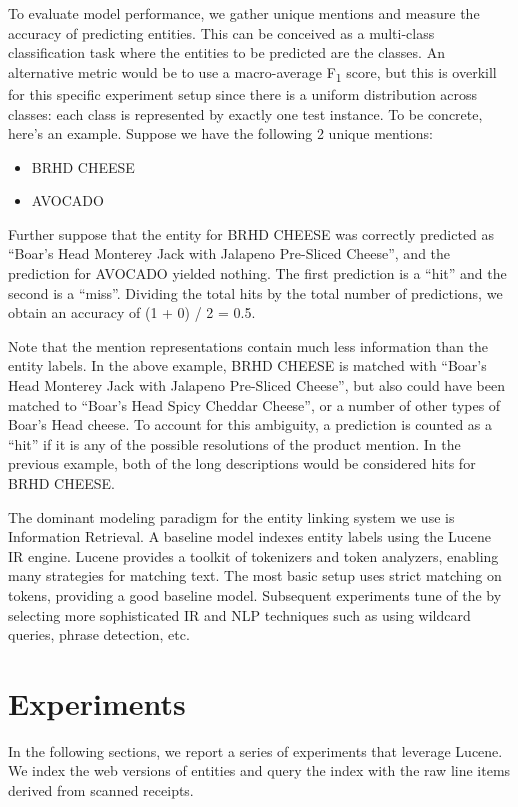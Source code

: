 \documentclass[11pt,a4paper]{article}
\newenvironment{myitemize}
{ \begin{itemize}
    \setlength{\itemsep}{0pt}
    \setlength{\parskip}{0pt}
    \setlength{\parsep}{0pt}     }
{ \end{itemize}                  }
\begin{document}
To evaluate model performance, we gather unique mentions and
measure the accuracy of predicting entities.  This can be conceived as
a multi-class classification task where the entities to be predicted
are the classes.  An alternative metric would be to use a
macro-average F\textsubscript{1} score, but this is overkill for this specific
experiment setup since there is a uniform distribution across classes:
each class is represented by exactly one test instance. 
To be concrete, here’s an example.  Suppose we have the following 2
unique mentions: 
\begin{myitemize}
\item BRHD CHEESE
\item AVOCADO
\end{myitemize}
Further suppose that the entity for BRHD CHEESE was correctly
predicted as “Boar's Head Monterey Jack with Jalapeno Pre-Sliced
Cheese”, and the prediction for AVOCADO yielded nothing.  The first
prediction is a ``hit'' and the second is a ``miss''.  Dividing the
total hits by the total number of predictions, we obtain an accuracy
of (1 + 0) / 2 = 0.5. 

Note that the mention representations contain
much less information than the entity labels.  In the above example,
BRHD CHEESE is matched with  ``Boar's Head Monterey Jack with Jalapeno
Pre-Sliced Cheese'', but also could have been matched to  ``Boar's
Head Spicy Cheddar Cheese'', or a number of other types of Boar’s Head
cheese.  To account for this ambiguity, a prediction is counted as a
“hit” if it is any of the possible resolutions of the product mention.
In the previous example, both of the long descriptions would be
considered hits for BRHD CHEESE. 

The dominant modeling paradigm for the entity linking system we use is
Information Retrieval.   A baseline model indexes entity labels using the Lucene
~\cite{lucene} IR
engine.  Lucene provides a toolkit of tokenizers and token analyzers,
enabling many strategies for matching text.  The most basic setup uses
strict matching on tokens, providing a good baseline model.
Subsequent experiments tune of the by selecting more
sophisticated IR and NLP techniques such as using wildcard
queries, phrase detection, etc.

\section{Experiments}

In the following sections, we report a series of experiments that
leverage Lucene.  We index the web versions of entities and query the
index with the raw line items derived from scanned receipts.
\end{document}
